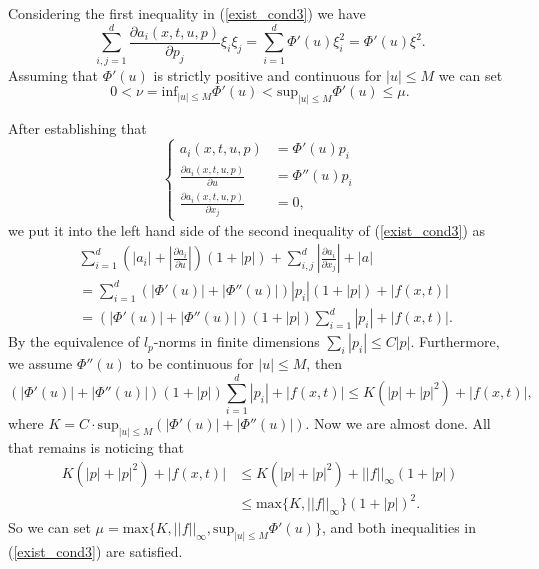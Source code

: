 \documentclass[11pt, a4paper]{article}
\begin{document}
\begin{appendices}
\begin{enumerate}[a)]
	Considering the first inequality in (\ref{exist_cond3}) we have
	\begin{equation*}
		\sum_{i,j=1}^d \frac{\partial a_i(x,t,u,p)}{\partial p_j} \xi_i \xi_j = \sum_{i=1}^d \Phi'(u)\xi_i^2 =\Phi'(u)\xi^2.
	\end{equation*}
	Assuming that $\Phi'(u)$ is strictly positive and continuous for $|u|\leq M$ we can set
	\begin{equation}
	0 < \nu = \text{inf}_{|u| \leq M}\Phi'(u) < \text{sup}_{|u| \leq M}\Phi'(u) \leq \mu.
	\end{equation}
	
	After establishing that
	\begin{equation*}
		\begin{cases}
			a_i(x,t,u,p) &= \Phi'(u)p_i \\
			\frac{\partial a_i(x,t,u,p)}{\partial u} &= \Phi''(u)p_i \\
			\frac{\partial a_i(x,t,u,p)}{\partial x_j} &= 0,
		\end{cases}	
	\end{equation*}
	we put it into the left hand side of the second inequality of (\ref{exist_cond3}) as
	\begin{align*}
	&\sum_{i=1}^d\left( |a_i| + \left| \frac{\partial a_i}{\partial u}\right| \right)(1+|p|) + \sum_{i,j}^d\left| \frac{\partial a_i}{\partial x_j} \right| + |a| \\
	&= \sum_{i=1}^d\left( |\Phi'(u)| + |\Phi''(u)| \right)|p_i|(1+|p|) + |f(x,t)| \\
	&= (|\Phi'(u)| + |\Phi''(u)|)(1+|p|)\sum_{i=1}^d|p_i| + |f(x,t)|.
	\end{align*}
	By the equivalence of $l_p$-norms in finite dimensions $\sum_i |p_i| \leq C|p|$. Furthermore, we assume $\Phi''(u)$ to be continuous for $|u|\leq M$, then
	\begin{equation*}
	(|\Phi'(u)| + |\Phi''(u)|)(1+|p|)\sum_{i=1}^d|p_i| + |f(x,t)| \leq K(|p| + |p|^2) + |f(x,t)|,
	\end{equation*}
	where $K = C\cdot \text{sup}_{|u|\leq M}(|\Phi'(u)| + |\Phi''(u)|)$. Now we are almost done. All that remains is noticing that
	\begin{align*}
	K(|p| + |p|^2) + |f(x,t)| &\leq K(|p| + |p|^2) + ||f||_{\infty}(1+|p|) \\
	&\leq \text{max}\{ K, ||f||_\infty \} (1+|p|)^2.
	\end{align*}
	So we can set $\mu = \text{max}\{K, ||f||_\infty, \text{sup}_{|u|\leq M}\Phi'(u) \}$, and both inequalities in (\ref{exist_cond3}) are satisfied.
	

\end{enumerate}
\end{appendices}
\end{document}
